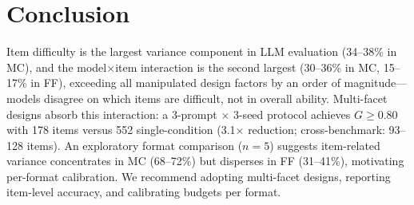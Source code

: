 \section{Conclusion}
\label{sec:conclusion}

Item difficulty is the largest variance component in LLM evaluation (34--38\% in MC), and the model$\times$item interaction is the second largest (30--36\% in MC, 15--17\% in FF), exceeding all manipulated design factors by an order of magnitude---models disagree on which items are difficult, not in overall ability. Multi-facet designs absorb this interaction: a 3-prompt $\times$ 3-seed protocol achieves $G \geq 0.80$ with 178 items versus 552 single-condition (3.1$\times$ reduction; cross-benchmark: 93--128 items). An exploratory format comparison ($n = 5$) suggests item-related variance concentrates in MC (68--72\%) but disperses in FF (31--41\%), motivating per-format calibration. We recommend adopting multi-facet designs, reporting item-level accuracy, and calibrating budgets per format.
